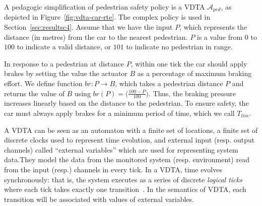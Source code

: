 \begin{example}
	\label{eg:vdta}
	
	A pedagogic simplification of pedestrian safety policy is a \ac{VDTA} $\mathcal{A}_{ped}$, as
        depicted in Figure~\ref{fig:vdta-car-rte}.
        The complex policy is used in Section~\ref{sec:resultsc4}.
	Assume that we have the input $P$, which represents the distance (in metres) from the car to the nearest pedestrian.
	$P$ is a value from $0$ to $100$ to indicate a valid distance, or $101$ to indicate no pedestrian in range.
	
	In response to a pedestrian at distance $P$, within one tick
        the car should apply brakes by setting the value the actuator
        $B$ as a percentage of maximum braking effort.
	We define function $br: P \rightarrow B$, which takes a
        pedestrian distance $P$ and returns the value of $B$ using $br\left(P\right) = \big(\frac{100 - P}{100}\big)$. 
	Thus, the braking pressure increases linearly based on the distance to the pedestrian. To ensure safety, the car must always apply brakes for a minimum period of time, which we call $T_{lim}$.
	
	
	
\end{example}

A VDTA can be seen as an automaton with a finite set of locations, a
finite set of discrete clocks used to represent time evolution, and
external input (resp. output channels) called ``external variables''
which are used for representing system data.They model the data from
the monitored system (resp. environment) read from the input (resp.)
channels in every tick. 
In a \ac{VDTA}, time evolves synchronously: that is, the system executes as a series of discrete \emph{logical ticks} where each tick takes exactly one transition~\cite{SynchronousLanguages12YearsLater}.
In the semantics of VDTA, each transition will be associated with values of external variables.

